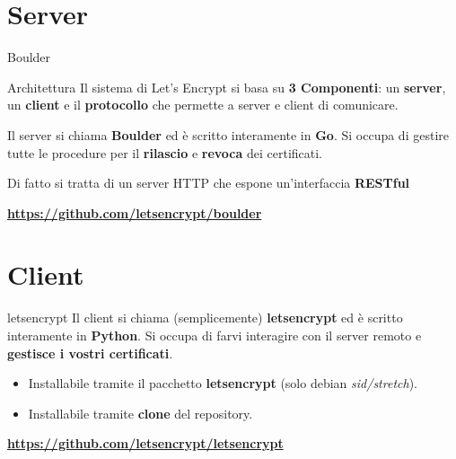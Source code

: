 \documentclass[xcolor=svgnames,11pt]{beamer}
\begin{document}
\section{Server}
\begin{frame}{Boulder}
\begin{block}{Architettura}
Il sistema di Let's Encrypt si basa su \textbf{3 Componenti}: un \textbf{server},
un \textbf{client} e il \textbf{protocollo} che permette a server e client di comunicare.
\end{block}

\medskip \pause

Il server si chiama \textbf{Boulder} ed è scritto interamente in \textbf{Go}.
Si occupa di gestire tutte le procedure per il \textbf{rilascio} e \textbf{revoca} dei certificati.

\medskip \pause

Di fatto si tratta di un server HTTP che espone un'interfaccia \textbf{RESTful}

\medskip \pause

\begin{center}
 \textbf{\url{https://github.com/letsencrypt/boulder}}
\end{center}
\end{frame}

\section{Client}

\begin{frame}{letsencrypt}
Il client si chiama (semplicemente) \textbf{letsencrypt} ed è scritto interamente in \textbf{Python}.
Si occupa di farvi interagire con il server remoto e \textbf{gestisce i vostri certificati}.
\pause
\begin{itemize}
  \item Installabile tramite il pacchetto \textbf{letsencrypt} (solo debian \emph{sid/stretch}).
  \item Installabile tramite \textbf{clone} del repository.
\end{itemize}
\pause
\begin{center}
 \textbf{\url{https://github.com/letsencrypt/letsencrypt}}
\end{center}
\end{frame}
\end{document}
